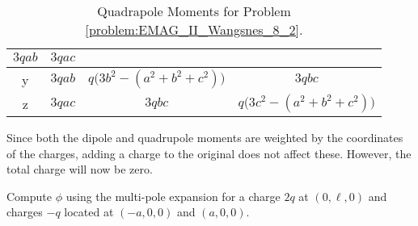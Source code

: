 \documentclass[crop=false,class=book,oneside]{standalone}
\begin{document}
\begin{solution}
\begin{table}[H]
{\begin{tabular}{|c|c|c|c|}
                            $3qab$&
                            $3qac$\\
                            \hline
                            y&
                            $3qab$&
                            $q\big(3b^{2}-(a^{2}+b^{2}+c^{2})\big)$
                            &$3qbc$\\
                            \hline
                            z&$3qac$&$3qbc$
                            &$q\big(3c^{2}-(a^{2}+b^{2}+c^{2})\big)$
                            \\
                            \hline
                        \end{tabular}
                    }
                    \caption{Quadrapole Moments for Problem
                             \ref{problem:EMAG_II_Wangsnes_8_2}.}
                    \label{tab:EMAG_2_Problem_8_2_%
                           Wangsness_Quadrupole}
                \end{table}
                Since both the dipole and quadrupole moments
                are weighted by the coordinates of the charges,
                adding a charge to the original does not affect
                these. However, the total charge will now be zero.
            \end{solution}
            \begin{problem}
                \label{problem:EMAG_II_Wangsnes_8_4}
                Compute $\phi$ using the multi-pole expansion for a
                charge $2q$ at $(0,\ell,0)$ and charges $-q$
                located at $(-a,0,0)$ and $(a,0,0)$.
            \end{problem}
\end{document}
